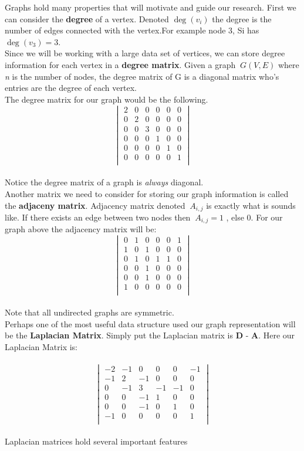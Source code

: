 \begin{itemize}
Graphs hold many properties that will motivate and guide our research. First we can consider the \textbf{degree} of a vertex. Denoted $\deg(v_{i})$ the degree is the number of edges connected with the vertex.For example node 3, Si has $\deg(v_{3}) = 3$. 
\bigskip
\\
Since we will be working with a large data set of vertices, we can store degree information for each vertex in a \textbf{degree matrix}. Given a graph $\ G(V,E)$ where \textit{n} is the number of nodes, the degree matrix of G is a diagonal matrix who's entries are the degree of each vertex. 
\bigskip
\\
The degree matrix for our graph would be the following. 
$$
\begin{vmatrix}
2&0&0&0&0&0\\
0&2&0&0&0&0\\
0&0&3&0&0&0\\
0&0&0&1&0&0\\
0&0&0&0&1&0\\
0&0&0&0&0&1\\
\end{vmatrix}
$$
\\
Notice the degree matrix of a graph is \textit{always} diagonal. 
\bigskip
\\
Another matrix we need to consider for storing our graph information is called the \textbf{adjaceny matrix}. Adjacency matrix denoted $\ A_{i,j}$ is exactly what is sounds like. If there exists an edge between two nodes then $\ A_{i,j} = 1$ , else 0. For our graph above the adjacency matrix will be:
\\
$$
\begin{vmatrix}
0&1&0&0&0&1\\
1&0&1&0&0&0\\
0&1&0&1&1&0\\
0&0&1&0&0&0\\
0&0&1&0&0&0\\
1&0&0&0&0&0\\
\end{vmatrix}
$$
\\
Note that all undirected graphs are symmetric. 
\bigskip
\\
Perhaps one of the most useful data structure used our graph representation will be the \textbf{Laplacian Matrix}. Simply put the Laplacian matrix is \textbf{D} - \textbf{A}. Here our Laplacian Matrix is:
\\
\\
$$
\begin{vmatrix}
-2 & -1 & 0 & 0 & 0 & -1\\
-1& 2&-1&0&0&0\\
0&-1&3&-1&-1&0\\
0&0&-1&1&0&0\\
0&0&-1&0&1&0\\
-1&0&0&0&0&1\\
\end{vmatrix}
$$
\bigskip
\\
Laplacian matrices hold several important features 


\end{itemize}
